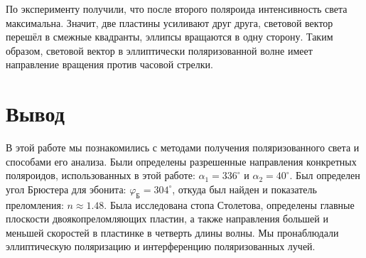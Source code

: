 \documentclass[a4paper,12pt]{article} %
\begin{document}
\hfill \break По эксперименту получили, что после второго поляроида интенсивность света максимальна. Значит, две пластины усиливают друг друга, световой вектор перешёл в смежные квадранты, эллипсы вращаются в одну сторону. Таким образом, световой вектор в эллиптически поляризованной волне имеет направление вращения против часовой стрелки.

\section{Вывод}
\hfill \break В этой работе мы познакомились с методами получения поляризованного света и способами его анализа. Были определены разрешенные направления конкретных поляроидов, использованных в этой работе: $\alpha_1 = 336^\circ$ и $\alpha_2 = 40^\circ$. Был определен угол Брюстера для эбонита: $\varphi_{\text{Б}} = 304^\circ$, откуда был найден и показатель преломления: $n \approx 1.48$. Была исследована стопа Столетова, определены главные плоскости двоякопреломляющих пластин, а также направления большей и меньшей скоростей в пластинке в четверть длины волны. Мы пронаблюдали эллиптическую поляризацию и интерференцию поляризованных лучей. 
\end{document}
